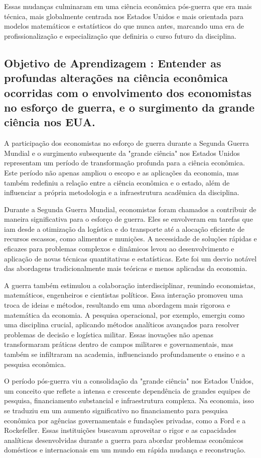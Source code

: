 \documentclass[a4paper,12pt]{article}[abntex2]
\begin{document}
Essas mudanças culminaram em uma ciência econômica pós-guerra que era mais técnica, mais globalmente centrada nos Estados Unidos e mais orientada para modelos matemáticos e estatísticos do que nunca antes, marcando uma era de profissionalização e especialização que definiria o curso futuro da disciplina.


\subsection{\textbf{Objetivo de Aprendizagem : Entender as profundas alterações na ciência econômica ocorridas com o envolvimento dos economistas no esforço de guerra, e o surgimento da grande ciência nos EUA. }}
A participação dos economistas no esforço de guerra durante a Segunda Guerra Mundial e o surgimento subsequente da "grande ciência" nos Estados Unidos representam um período de transformação profunda para a ciência econômica. Este período não apenas ampliou o escopo e as aplicações da economia, mas também redefiniu a relação entre a ciência econômica e o estado, além de influenciar a própria metodologia e a infraestrutura acadêmica da disciplina.

Durante a Segunda Guerra Mundial, economistas foram chamados a contribuir de maneira significativa para o esforço de guerra. Eles se envolveram em tarefas que iam desde a otimização da logística e do transporte até a alocação eficiente de recursos escassos, como alimentos e munições. A necessidade de soluções rápidas e eficazes para problemas complexos e dinâmicos levou ao desenvolvimento e aplicação de novas técnicas quantitativas e estatísticas. Este foi um desvio notável das abordagens tradicionalmente mais teóricas e menos aplicadas da economia.

A guerra também estimulou a colaboração interdisciplinar, reunindo economistas, matemáticos, engenheiros e cientistas políticos. Essa interação promoveu uma troca de ideias e métodos, resultando em uma abordagem mais rigorosa e matemática da economia. A pesquisa operacional, por exemplo, emergiu como uma disciplina crucial, aplicando métodos analíticos avançados para resolver problemas de decisão e logística militar. Essas inovações não apenas transformaram práticas dentro de campos militares e governamentais, mas também se infiltraram na academia, influenciando profundamente o ensino e a pesquisa econômica.

O período pós-guerra viu a consolidação da "grande ciência" nos Estados Unidos, um conceito que reflete a intensa e crescente dependência de grandes equipes de pesquisa, financiamento substancial e infraestrutura complexa. Na economia, isso se traduziu em um aumento significativo no financiamento para pesquisa econômica por agências governamentais e fundações privadas, como a Ford e a Rockefeller. Essas instituições buscavam aproveitar o rigor e as capacidades analíticas desenvolvidas durante a guerra para abordar problemas econômicos domésticos e internacionais em um mundo em rápida mudança e reconstrução.
\end{document}
